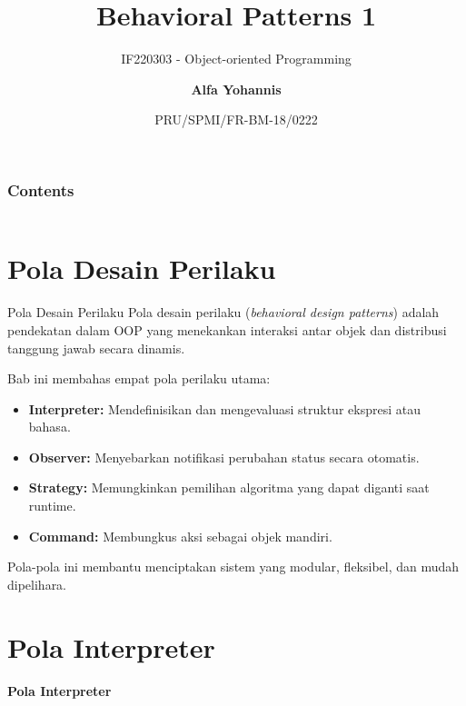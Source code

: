 \documentclass[aspectratio=169, table]{beamer}
\subtitle{IF220303 - Object-oriented Programming}
\title{\Huge{Behavioral Patterns 1}\\\vspace{30pt}}
\date[Serial]{\scriptsize {PRU/SPMI/FR-BM-18/0222}}
\author[Pradita]{\small {\textbf{Alfa Yohannis}}}
\begin{document}
\frame{\titlepage}

\begin{frame}[fragile]
\frametitle{Contents}
\vspace{20pt}
\begin{columns}[t]
\tableofcontents[sections={1-2}]

\tableofcontents[sections={3-4}]
\end{columns}
\end{frame}


\section{Pola Desain Perilaku}

\begin{frame}{Pola Desain Perilaku}
	\vspace{10pt}
	Pola desain perilaku (\textit{behavioral design patterns}) adalah pendekatan dalam OOP yang menekankan interaksi antar objek dan distribusi tanggung jawab secara dinamis.
	
	\vspace{10pt}
	Bab ini membahas empat pola perilaku utama:
	\begin{itemize}
		\item \textbf{Interpreter:} Mendefinisikan dan mengevaluasi struktur ekspresi atau bahasa.
		\item \textbf{Observer:} Menyebarkan notifikasi perubahan status secara otomatis.
		\item \textbf{Strategy:} Memungkinkan pemilihan algoritma yang dapat diganti saat runtime.
		\item \textbf{Command:} Membungkus aksi sebagai objek mandiri.
	\end{itemize}
	
	\vspace{5pt}
	Pola-pola ini membantu menciptakan sistem yang modular, fleksibel, dan mudah dipelihara.
\end{frame}


\section{Pola Interpreter}

\begin{frame}{\hfill}
	\centering
	\textbf{\Huge{Pola Interpreter}}
\end{frame}
\end{document}
